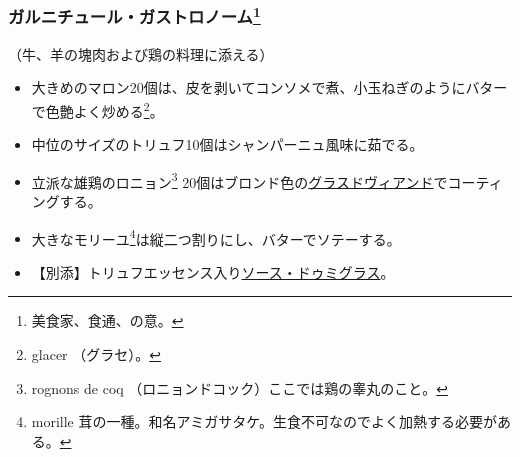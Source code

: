 \begin{recette}
\atoaki{}

\hypertarget{garniture-gastronome}{%
\subsubsection[ガルニチュール・ガストロノーム]{\texorpdfstring{ガルニチュール・ガストロノーム\footnote{美食家、食通、の意。}}{ガルニチュール・ガストロノーム}}\label{garniture-gastronome}}



（牛、羊の塊肉および鶏の料理に添える）

\begin{itemize}
\item
  大きめのマロン20個は、皮を剥いてコンソメで煮、小玉ねぎのようにバターで色艶よく炒める\footnote{glacer
    （グラセ）。}。
\item
  中位のサイズのトリュフ10個はシャンパーニュ風味に茹でる。
\item
  立派な雄鶏のロニョン\footnote{rognons de coq
    （ロニョンドコック）ここでは鶏の睾丸のこと。}
  20個はブロンド色の\protect\hyperlink{glace-de-viande}{グラスドヴィアンド}でコーティングする。
\item
  大きなモリーユ\footnote{morille
    茸の一種。和名アミガサタケ。生食不可なのでよく加熱する必要がある。}は縦二つ割りにし、バターでソテーする。
\item
  【別添】トリュフエッセンス入り\protect\hyperlink{sauce-demi-glace}{ソース・ドゥミグラス}。
\end{itemize}

\atoaki{}

\hypertarget{garniture-godard}{%
}
\end{recette}
